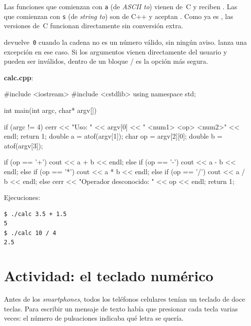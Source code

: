 \documentclass[12pt, oneside]{article}
\begin{document}
Las funciones que comienzan con \texttt{a} (de \textit{ASCII to}) vienen
de~C y reciben .  Las que comienzan con \texttt{s} (de
\textit{string to}) son de C++ y aceptan .  Como
 ya es , las versiones de~C funcionan
directamente sin conversión extra.

\begin{advertencia}
   devuelve~\texttt{0} cuando la cadena no es un número
  válido, sin ningún aviso.   lanza una excepción en ese caso.
  Si los argumentos vienen directamente del usuario y pueden ser
  inválidos,  dentro de un bloque / es
  la opción más segura.
\end{advertencia}

\begin{ejemplo}
  \textbf{calc.cpp}:

\begin{codigo}
#include <iostream>
#include <cstdlib>
using namespace std;

int main(int argc, char* argv[]){
    if (argc != 4){
        cerr << "Uso: " << argv[0]
             << " <num1> <op> <num2>" << endl;
        return 1;
    }
    double a  = atof(argv[1]);
    char   op = argv[2][0];
    double b  = atof(argv[3]);

    if      (op == '+') cout << a + b << endl;
    else if (op == '-') cout << a - b << endl;
    else if (op == '*') cout << a * b << endl;
    else if (op == '/') cout << a / b << endl;
    else {
        cerr << "Operador desconocido: " << op << endl;
        return 1;
    }
}
\end{codigo}

  Ejecuciones:
  \begin{verbatim}
$ ./calc 3.5 + 1.5
5
$ ./calc 10 / 4
2.5
  \end{verbatim}
\end{ejemplo}

\section{Actividad: el teclado numérico}

Antes de los \textit{smartphones}, todos los teléfonos celulares tenían un
teclado de doce teclas.  Para escribir un mensaje de texto había que
presionar cada tecla varias veces: el número de pulsaciones indicaba qué
letra se quería.
\end{document}
